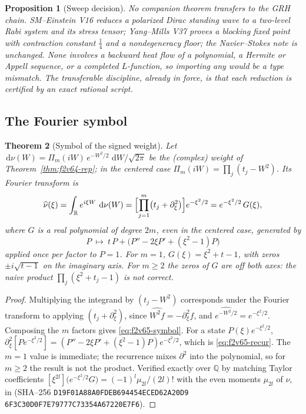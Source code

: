 \documentclass[11pt]{article}
\newtheorem{theorem}{Theorem}[section]
\newtheorem{proposition}[theorem]{Proposition}
\theoremstyle{definition}
\theoremstyle{remark}
\newcommand{\dd}{\,\mathrm d}
\begin{document}
\begin{proposition}[Sweep decision]
\label{prop:f2v65-sweep}
No companion theorem transfers to the GRH chain.  SM--Einstein V16
reduces a polarized Dirac standing wave to a two-level Rabi system and
its stress tensor; Yang--Mills V37 proves a blocking fixed point with
contraction constant \(\tfrac14\) and a nondegeneracy floor; the
Navier--Stokes note is unchanged.  None involves a backward heat flow of
a polynomial, a Hermite or Appell sequence, or a completed
\(L\)-function, so importing any would be a type mismatch.  The
transferable discipline, already in force, is that each reduction is
certified by an exact rational script.
\end{proposition}

\subsection{The Fourier symbol}

\begin{theorem}[Symbol of the signed weight]
\label{thm:f2v65-symbol}
Let \(\dd\nu(W)=\Pi_m(iW)\,e^{-W^2/2}\,\dd W/\sqrt{2\pi}\) be the (complex)
weight of Theorem~\ref{thm:f2v64-rep}; in the centered case
\(\Pi_m(iW)=\prod_j(t_j-W^2)\).  Its Fourier transform is
\begin{equation}
 \widehat\nu(\xi)=\int_{\mathbb R}e^{i\xi W}\,\dd\nu(W)
 =\Bigl[\prod_{j=1}^m\bigl(t_j+\partial_\xi^2\bigr)\Bigr]e^{-\xi^2/2}
 =e^{-\xi^2/2}\,G(\xi),
 \label{eq:f2v65-symbol}
\end{equation}
where \(G\) is a real polynomial of degree \(2m\), even in the centered
case, generated by
\begin{equation}
 P\ \longmapsto\ t\,P+\bigl(P''-2\xi P'+(\xi^2-1)P\bigr)
 \label{eq:f2v65-recur}
\end{equation}
applied once per factor to \(P=1\).  For \(m=1\),
\(G(\xi)=\xi^2+t-1\), with zeros \(\pm i\sqrt{t-1}\) on the imaginary
axis.  For \(m\ge2\) the zeros of \(G\) are off both axes:
the naive product \(\prod_j(\xi^2+t_j-1)\) is \emph{not} correct.
\end{theorem}

\begin{proof}
Multiplying the integrand by \((t_j-W^2)\) corresponds under the Fourier
transform to applying \((t_j+\partial_\xi^2)\), since
\(\widehat{W^2 f}=-\partial_\xi^2\widehat f\), and
\(\widehat{e^{-W^2/2}}=e^{-\xi^2/2}\).  Composing the \(m\) factors gives
\eqref{eq:f2v65-symbol}.  For a state \(P(\xi)e^{-\xi^2/2}\),
\(\partial_\xi^2[Pe^{-\xi^2/2}]=(P''-2\xi P'+(\xi^2-1)P)e^{-\xi^2/2}\),
which is \eqref{eq:f2v65-recur}.  The \(m=1\) value is immediate; the
recurrence mixes \(\partial^2\) into the polynomial, so for \(m\ge2\) the
result is not the product.  Verified exactly over \(\mathbb Q\) by
matching Taylor coefficients
\([\xi^{2l}]\bigl(e^{-\xi^2/2}G\bigr)=(-1)^l\mu_{2l}/(2l)!\) with the even
moments \(\mu_{2l}\) of \(\nu\), in
 (SHA--256
\texttt{D19F01A88A0FDEB694454ECED62A20D9}\allowbreak
\texttt{6F3C30D0F7E79777C73354A67220E7F6}).
\end{proof}
\end{document}
